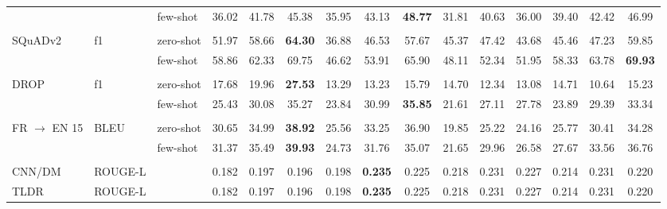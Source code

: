 \begin{tabular}{lll<{\hspace{0.8 ex}}>{\hspace{0.8 ex}}ccc<{\hspace{0.8 ex}}>{\hspace{0.8 ex}}ccc<{\hspace{0.8 ex}}>{\hspace{0.8 ex}}ccc<{\hspace{0.8 ex}}>{\hspace{0.8 ex}}ccc<{\hspace{0.8 ex}}}
                           &             & few-shot      & 36.02 & 41.78 & 45.38 &  35.95 &  43.13 & \textbf{48.77} &  31.81 & 40.63 & 36.00 &  39.40 &  42.42 & 46.99 \\
                           &             &               &       &       &       &        &        &       &        &       &       &        &        &       \\
    SQuADv2                & f1          & zero-shot     & 51.97 & 58.66 & \textbf{64.30} &  36.88 &  46.53 & 57.67 &  45.37 & 47.42 & 43.68 &  45.46 &  47.23 & 59.85 \\
                           &             & few-shot      & 58.86 & 62.33 & 69.75 &  46.62 &  53.91 & 65.90 &  48.11 & 52.34 & 51.95 &  58.33 &  63.78 & \textbf{69.93}  \\
                           &             &               &       &       &       &        &        &       &        &       &       &        &        &       \\
    DROP                   & f1          & zero-shot     & 17.68 & 19.96 & \textbf{27.53} &  13.29 &  13.23 & 15.79 &  14.70 & 12.34 & 13.08 &  14.71 &  10.64 & 15.23 \\
                           &             & few-shot      & 25.43 & 30.08 & 35.27 &  23.84 &  30.99 & \textbf{35.85} &  21.61 & 27.11 & 27.78 &  23.89 &  29.39 & 33.34 \\
                           &             &               &       &       &       &        &        &       &        &       &       &        &        &       \\
    FR $\rightarrow$ EN 15 & BLEU        & zero-shot     & 30.65 & 34.99 & \textbf{38.92} &  25.56 &  33.25 & 36.90 &  19.85 & 25.22 & 24.16 &  25.77 &  30.41 & 34.28 \\
                           &             & few-shot      & 31.37 & 35.49 & \textbf{39.93} &  24.73 &  31.76 & 35.07 &  21.65 & 29.96 & 26.58 &  27.67 &  33.56 & 36.76 \\
                           &             &               &       &       &       &        &        &       &        &       &       &        &        &       \\
    CNN/DM                 & ROUGE-L     &               & 0.182 & 0.197 & 0.196 &  0.198 & \textbf{0.235} & 0.225 &  0.218 & 0.231 & 0.227 &  0.214 &  0.231 & 0.220 \\
    TLDR                   & ROUGE-L     &               & 0.182 & 0.197 & 0.196 &  0.198 & \textbf{0.235} & 0.225 &  0.218 & 0.231 & 0.227 &  0.214 &  0.231 & 0.220 \\
    \bottomrule
\end{tabular}

\setlength{\savedtabcolsep}{\tabcolsep}
